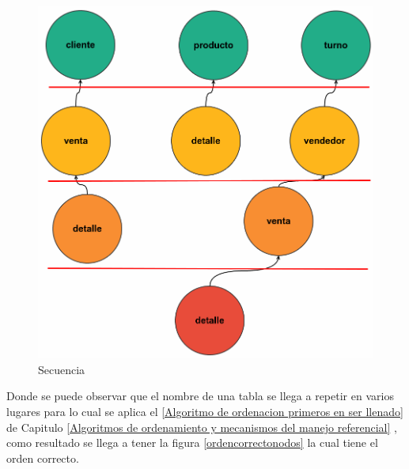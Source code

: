 \begin{figure}[H]
\centering
\includegraphics[scale=0.2]{images/desordenadocomp.png}
\caption{Secuencia}
\label{desodenadocomp}
\end{figure}
Donde se puede observar que el nombre de una tabla se llega a repetir en varios lugares para lo cual se aplica el \ref{Algoritmo de ordenacion primeros en ser llenado} de Capitulo \ref{Algoritmos de ordenamiento y mecanismos del manejo referencial} , como resultado se llega a tener la figura \ref{ordencorrectonodos} la cual tiene el orden correcto.
